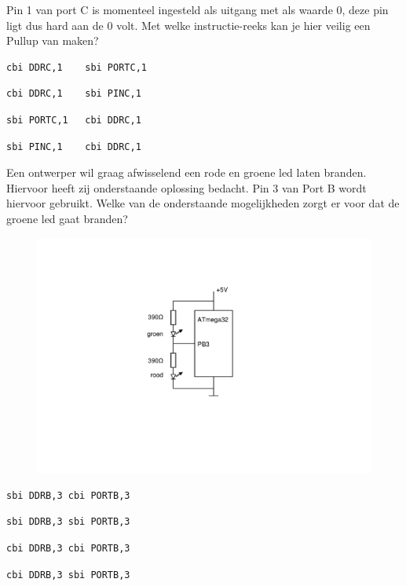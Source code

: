 \documentclass[a4paper,12pt,fleqn,dutch]{tisdexam}
\begin{document}
\begin{questions}
\question
\label{opg:opg8}
Pin 1 van port C is momenteel ingesteld als uitgang met als waarde 0, deze pin ligt dus hard
aan de 0 volt. Met welke instructie-reeks kan je hier veilig een Pullup van maken?
\begin{choices}
	\CorrectChoice \label{ans:opg8} \begin{verbatim}cbi DDRC,1    sbi PORTC,1\end{verbatim}
	\choice \begin{verbatim}cbi DDRC,1    sbi PINC,1\end{verbatim}
	\choice \begin{verbatim}sbi PORTC,1   cbi DDRC,1\end{verbatim}
	\choice \begin{verbatim}sbi PINC,1    cbi DDRC,1\end{verbatim}
\end{choices}


\question
\label{opg:opg9}
Een ontwerper wil graag afwisselend een rode en groene led laten branden. Hiervoor heeft zij
onderstaande oplossing bedacht. Pin 3 van Port B wordt hiervoor gebruikt. Welke van de
onderstaande mogelijkheden zorgt er voor dat de groene led gaat branden?
\begin{figure}[H]
  \centering
    \includegraphics*[viewport=270 180 500 490,scale=0.55]{pINLMIC_led_schak.pdf}
\end{figure}
\begin{choices}
	\CorrectChoice \label{ans:opg9} \begin{verbatim}sbi DDRB,3 cbi PORTB,3\end{verbatim}
	\choice \begin{verbatim}sbi DDRB,3 sbi PORTB,3\end{verbatim}
	\choice \begin{verbatim}cbi DDRB,3 cbi PORTB,3\end{verbatim}
	\choice \begin{verbatim}cbi DDRB,3 sbi PORTB,3\end{verbatim}
\end{choices}



\end{questions}
\end{document}
